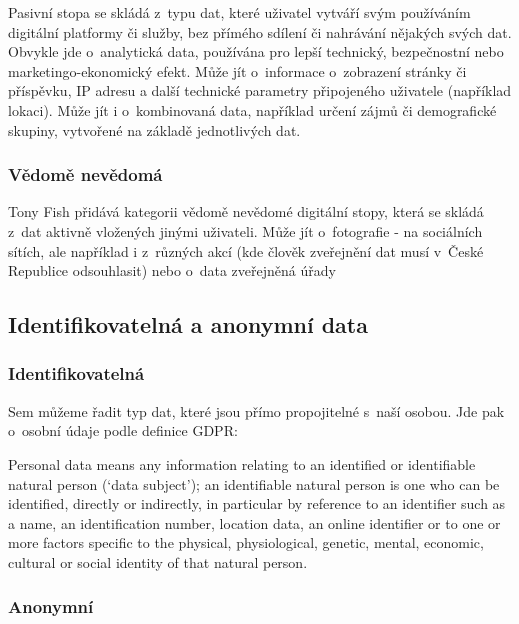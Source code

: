 Pasivní stopa se skládá z~typu dat, které uživatel vytváří svým používáním digitální platformy či služby, bez přímého sdílení či nahrávání nějakých svých dat. Obvykle jde o~analytická data, používána pro lepší technický, bezpečnostní nebo marketingo-ekonomický efekt. Může jít o~informace o~zobrazení stránky či příspěvku, IP adresu a další technické parametry připojeného uživatele (například lokaci). Může jít i o~kombinovaná data, například určení zájmů či demografické skupiny, vytvořené na základě jednotlivých dat.

\subsubsection{Vědomě nevědomá}

Tony Fish přidává kategorii vědomě nevědomé digitální stopy, která se skládá z~dat aktivně vložených jinými uživateli\citep{fish-digital-footprint}.
Může jít o~fotografie - na sociálních sítích, ale například i z~různých akcí (kde člověk zveřejnění dat musí v~České Republice odsouhlasit) nebo o~data zveřejněná úřady

\subsection{Identifikovatelná a anonymní data}

\subsubsection{Identifikovatelná}

Sem můžeme řadit typ dat, které jsou přímo propojitelné s~naší osobou. Jde pak o~osobní údaje podle definice GDPR:

\begin{displayquote}
Personal data means any information relating to an identified or identifiable natural person (‘data subject’); an identifiable natural person is one who can be identified, directly or indirectly, in particular by reference to an identifier such as a name, an identification number, location data, an online identifier or to one or more factors specific to the physical, physiological, genetic, mental, economic, cultural or social identity of that natural person.\citep{gdpr}
\end{displayquote}

\subsubsection{Anonymní}

